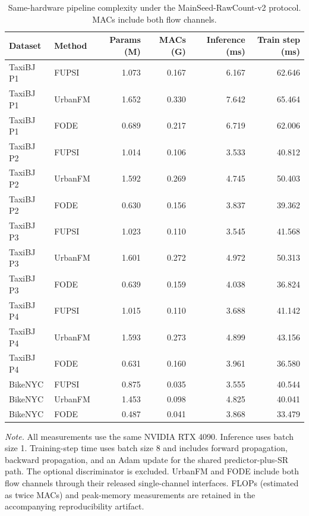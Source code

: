 \begin{table}[!htbp]
\centering
\small
\caption{Same-hardware pipeline complexity under the MainSeed-RawCount-v2 protocol. MACs include both flow channels.}
\label{tab:same-hardware-complexity}
\setlength{\tabcolsep}{4pt}
\begin{tabular}{llrrrr}
\toprule
Dataset & Method & Params (M) & MACs (G) & Inference (ms) & Train step (ms) \\
\midrule
TaxiBJ P1 & FUPSI & 1.073 & 0.167 & 6.167 & 62.646 \\
TaxiBJ P1 & UrbanFM & 1.652 & 0.330 & 7.642 & 65.464 \\
TaxiBJ P1 & FODE & 0.689 & 0.217 & 6.719 & 62.006 \\
\addlinespace
TaxiBJ P2 & FUPSI & 1.014 & 0.106 & 3.533 & 40.812 \\
TaxiBJ P2 & UrbanFM & 1.592 & 0.269 & 4.745 & 50.403 \\
TaxiBJ P2 & FODE & 0.630 & 0.156 & 3.837 & 39.362 \\
\addlinespace
TaxiBJ P3 & FUPSI & 1.023 & 0.110 & 3.545 & 41.568 \\
TaxiBJ P3 & UrbanFM & 1.601 & 0.272 & 4.972 & 50.313 \\
TaxiBJ P3 & FODE & 0.639 & 0.159 & 4.038 & 36.824 \\
\addlinespace
TaxiBJ P4 & FUPSI & 1.015 & 0.110 & 3.688 & 41.142 \\
TaxiBJ P4 & UrbanFM & 1.593 & 0.273 & 4.899 & 43.156 \\
TaxiBJ P4 & FODE & 0.631 & 0.160 & 3.961 & 36.580 \\
\addlinespace
BikeNYC & FUPSI & 0.875 & 0.035 & 3.555 & 40.544 \\
BikeNYC & UrbanFM & 1.453 & 0.098 & 4.825 & 40.041 \\
BikeNYC & FODE & 0.487 & 0.041 & 3.868 & 33.479 \\
\bottomrule
\end{tabular}
\begin{minipage}{0.96\linewidth}
\footnotesize \textit{Note.} All measurements use the same NVIDIA RTX 4090. Inference uses batch size 1. Training-step time uses batch size 8 and includes forward propagation, backward propagation, and an Adam update for the shared predictor-plus-SR path. The optional discriminator is excluded. UrbanFM and FODE include both flow channels through their released single-channel interfaces. FLOPs (estimated as twice MACs) and peak-memory measurements are retained in the accompanying reproducibility artifact.
\end{minipage}
\end{table}
